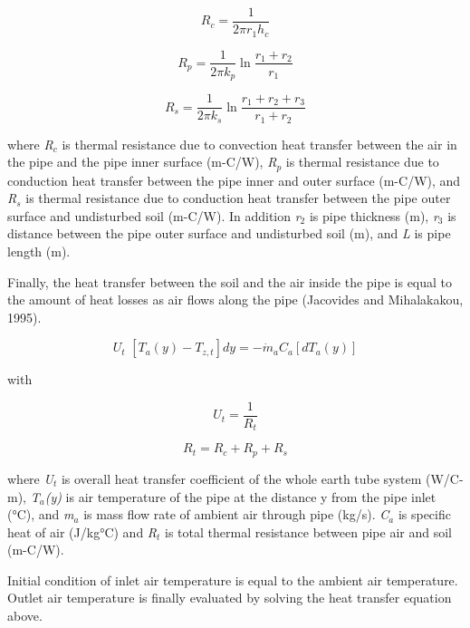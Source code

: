 \begin{equation}
{R_c} = \frac{1}{{2\pi {r_1}{h_c}}}
\end{equation}

\begin{equation}
{R_p} = \frac{1}{{2\pi {k_p}}}\ln \frac{{{r_1} + {r_2}}}{{{r_1}}}
\end{equation}

\begin{equation}
{R_s} = \frac{1}{{2\pi {k_s}}}\ln \frac{{{r_1} + {r_2} + {r_3}}}{{{r_1} + {r_2}}}
\end{equation}

where \emph{R\(_{c}\)} is thermal resistance due to convection heat transfer between the air in the pipe and the pipe inner surface (m-C/W), \emph{R\(_{p}\)} is thermal resistance due to conduction heat transfer between the pipe inner and outer surface (m-C/W), and \emph{R\(_{s}\)} is thermal resistance due to conduction heat transfer between the pipe outer surface and undisturbed soil (m-C/W). In addition \emph{r\(_{2}\)} is pipe thickness (m), \emph{r\(_{3}\)} is distance between the pipe outer surface and undisturbed soil (m), and \emph{L} is pipe length (m).

Finally, the heat transfer between the soil and the air inside the pipe is equal to the amount of heat losses as air flows along the pipe (Jacovides and Mihalakakou, 1995).

\begin{equation}
{U_t}\,\,\left[ {{T_a}(y) - {T_{z,t}}} \right]dy =  - {\dot m_a}{C_a}\left[ {d{T_a}(y)} \right]
\end{equation}

with

\begin{equation}
{U_t} = \frac{1}{{{R_t}}}
\end{equation}

\begin{equation}
{R_t} = {R_c} + {R_p} + {R_s}
\end{equation}

where \emph{U\(_{t}\)} is overall heat transfer coefficient of the whole earth tube system (W/C-m), \emph{T\(_{a}\)(y)} is air temperature of the pipe at the distance y from the pipe inlet (°C), and \emph{m\(_{a}\)} is mass flow rate of ambient air through pipe (kg/s). \emph{C\(_{a}\)} is specific heat of air (J/kg°C) and \emph{R\(_{t}\)} is total thermal resistance between pipe air and soil (m-C/W).

Initial condition of inlet air temperature is equal to the ambient air temperature. Outlet air temperature is finally evaluated by solving the heat transfer equation above.

